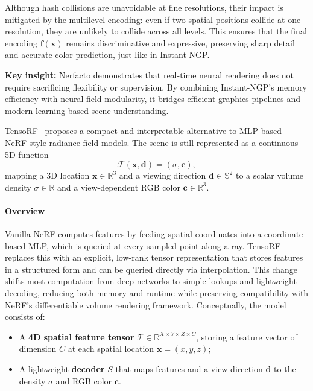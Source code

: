 \begin{enrichment}
\begin{enrichment}
    \medskip
    
    Although hash collisions are unavoidable at fine resolutions, their impact is mitigated by the multilevel encoding: even if two spatial positions collide at one resolution, they are unlikely to collide across all levels. This ensures that the final encoding \( \mathbf{f}(\mathbf{x}) \) remains discriminative and expressive, preserving sharp detail and accurate color prediction, just like in Instant-NGP. 
    
    \medskip
    
    \noindent
    \textbf{Key insight:} Nerfacto demonstrates that real-time neural rendering does not require sacrificing flexibility or supervision. By combining Instant-NGP’s memory efficiency with neural field modularity, it bridges efficient graphics pipelines and modern learning-based scene understanding.
\end{enrichment} 
    
\begin{enrichment}
    \label{enr:subsec_chapter23_tensorf}
        
    TensoRF~\cite{chen2022_tensorf} proposes a compact and interpretable alternative to MLP-based NeRF-style radiance field models. The scene is still represented as a continuous 5D function
    \[
    \mathcal{F}(\mathbf{x}, \mathbf{d}) = (\sigma, \mathbf{c}),
    \]
    mapping a 3D location \( \mathbf{x} \in \mathbb{R}^3 \) and a viewing direction \( \mathbf{d} \in \mathbb{S}^2 \) to a scalar volume density \( \sigma \in \mathbb{R} \) and a view-dependent RGB color \( \mathbf{c} \in \mathbb{R}^3 \).
    
    \paragraph{Overview}
    
    Vanilla NeRF computes features by feeding spatial coordinates into a coordinate-based MLP, which is queried at every sampled point along a ray. TensoRF replaces this with an explicit, low-rank tensor representation that stores features in a structured form and can be queried directly via interpolation. This change shifts most computation from deep networks to simple lookups and lightweight decoding, reducing both memory and runtime while preserving compatibility with NeRF’s differentiable volume rendering framework. Conceptually, the model consists of:
    \begin{itemize}
        \item A \textbf{4D spatial feature tensor} \( \mathcal{T} \in \mathbb{R}^{X \times Y \times Z \times C} \), storing a feature vector of dimension \(C\) at each spatial location \(\mathbf{x} = (x,y,z)\);
        \item A lightweight \textbf{decoder} \(S\) that maps features and a view direction \(\mathbf{d}\) to the density \(\sigma\) and RGB color \(\mathbf{c}\).
    \end{itemize}
    

\end{enrichment}
\end{enrichment}
